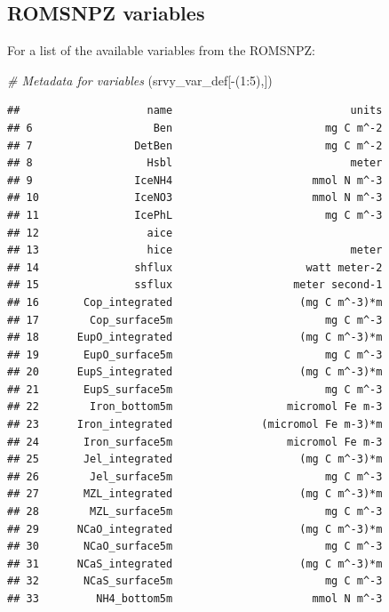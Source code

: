 \documentclass[
]{article}
\newenvironment{Shaded}{\begin{snugshade}}{\end{snugshade}}
\newcommand{\CommentTok}[1]{\textcolor[rgb]{0.56,0.35,0.01}{\textit{#1}}}
\newcommand{\DecValTok}[1]{\textcolor[rgb]{0.00,0.00,0.81}{#1}}
\newcommand{\NormalTok}[1]{#1}
\newcommand{\SpecialCharTok}[1]{\textcolor[rgb]{0.00,0.00,0.00}{#1}}
\begin{document}
\hypertarget{romsnpz-variables}{%
\subsection{ROMSNPZ variables}\label{romsnpz-variables}}

For a list of the available variables from the ROMSNPZ:

\begin{Shaded}
\begin{Highlighting}[]
    \CommentTok{\# Metadata for variables}
\NormalTok{    (srvy\_var\_def[}\SpecialCharTok{{-}}\NormalTok{(}\DecValTok{1}\SpecialCharTok{:}\DecValTok{5}\NormalTok{),])}
\end{Highlighting}
\end{Shaded}

\begin{verbatim}
##                    name                            units
## 6                   Ben                        mg C m^-2
## 7                DetBen                        mg C m^-2
## 8                  Hsbl                            meter
## 9                IceNH4                      mmol N m^-3
## 10               IceNO3                      mmol N m^-3
## 11               IcePhL                        mg C m^-3
## 12                 aice                                 
## 13                 hice                            meter
## 14               shflux                     watt meter-2
## 15               ssflux                   meter second-1
## 16       Cop_integrated                    (mg C m^-3)*m
## 17        Cop_surface5m                        mg C m^-3
## 18      EupO_integrated                    (mg C m^-3)*m
## 19       EupO_surface5m                        mg C m^-3
## 20      EupS_integrated                    (mg C m^-3)*m
## 21       EupS_surface5m                        mg C m^-3
## 22        Iron_bottom5m                  micromol Fe m-3
## 23      Iron_integrated              (micromol Fe m-3)*m
## 24       Iron_surface5m                  micromol Fe m-3
## 25       Jel_integrated                    (mg C m^-3)*m
## 26        Jel_surface5m                        mg C m^-3
## 27       MZL_integrated                    (mg C m^-3)*m
## 28        MZL_surface5m                        mg C m^-3
## 29      NCaO_integrated                    (mg C m^-3)*m
## 30       NCaO_surface5m                        mg C m^-3
## 31      NCaS_integrated                    (mg C m^-3)*m
## 32       NCaS_surface5m                        mg C m^-3
## 33         NH4_bottom5m                      mmol N m^-3

\end{verbatim}
\end{document}

